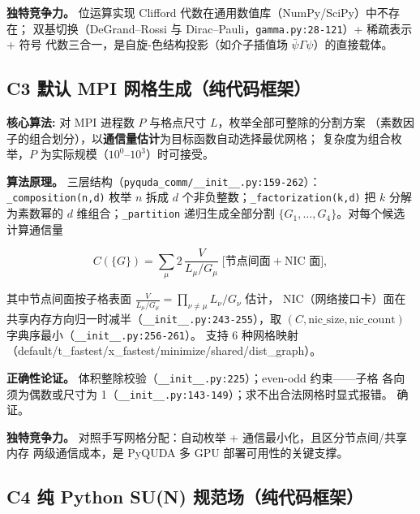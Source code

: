 \documentclass[UTF8]{ctexart}
\begin{document}
\textbf{独特竞争力。} 位运算实现 Clifford 代数在通用数值库（NumPy/SciPy）中不存在；
双基切换（DeGrand--Rossi 与 Dirac--Pauli，\texttt{gamma.py:28-121}）+ 稀疏表示 + 符号
代数三合一，是自旋-色结构投影（如介子插值场 $\bar\psi\Gamma\psi$）的直接载体。

\subsection{C3 默认 MPI 网格生成（纯代码框架）}

\begin{algobox}
\textbf{核心算法:} 对 MPI 进程数 $P$ 与格点尺寸 $L$，枚举全部可整除的分割方案
（素数因子的组合划分），以\textbf{通信量估计}为目标函数自动选择最优网格；
复杂度为组合枚举，$P$ 为实际规模（$10^0$--$10^3$）时可接受。
\end{algobox}

\textbf{算法原理。} 三层结构（\texttt{pyquda\_comm/\_\_init\_\_.py:159-262}）：
\texttt{\_composition(n,d)} 枚举 $n$ 拆成 $d$ 个非负整数；\texttt{\_factorization(k,d)}
把 $k$ 分解为素数幂的 $d$ 维组合；\texttt{\_partition} 递归生成全部分割
$\{G_1,\dots,G_4\}$。对每个候选计算通信量

\begin{equation}\label{eq:comm}
C(\{G\}) = \sum_{\mu} 2\,\frac{V}{L_\mu/G_\mu}\;\big[\text{节点间面}+\text{NIC 面}\big],
\end{equation}

其中节点间面按子格表面 $\tfrac{V}{L_\mu/G_\mu} = \prod_{\nu\ne\mu} L_\nu/G_\nu$ 估计，
NIC（网络接口卡）面在共享内存方向归一时减半（\texttt{\_\_init\_\_.py:243-255}），取
$(C, \text{nic\_size}, \text{nic\_count})$ 字典序最小（\texttt{\_\_init\_\_.py:256-261}）。
支持 6 种网格映射（default/t\_fastest/x\_fastest/minimize/shared/dist\_graph）。

\textbf{正确性论证。} 体积整除校验（\texttt{\_\_init\_\_.py:225}）；even-odd 约束——子格
各向须为偶数或尺寸为 1（\texttt{\_\_init\_\_.py:143-149}）；求不出合法网格时显式报错。
\textcolor{accent}{确证}。

\textbf{独特竞争力。} 对照手写网格分配：自动枚举 + 通信最小化，且区分节点间/共享内存
两级通信成本，是 PyQUDA 多 GPU 部署可用性的关键支撑。

\subsection{C4 纯 Python SU(N) 规范场（纯代码框架）}
\end{document}
